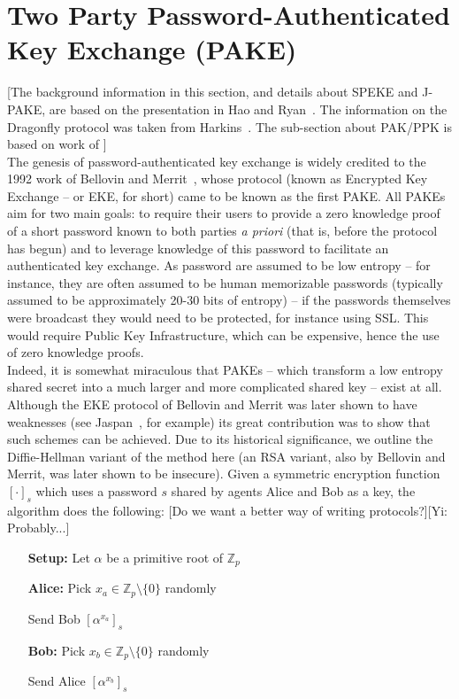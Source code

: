 \documentclass{amsart}
\newcommand{\comment}[1]{\marginpar{\color{red}{\Huge$*$}}\mbox{}{\sf\color{red}[#1]}}
\theoremstyle{remark}
\begin{document}

\section{Two Party Password-Authenticated Key Exchange (PAKE)} 
\label{sec:PAKE}
 [The background information in this section, and details about SPEKE and J-PAKE, are based on the presentation 
 in Hao and Ryan~\cite{HaRy2010}. The information on the Dragonfly protocol was taken from Harkins~\cite{Ha15}.  
 The sub-section about PAK/PPK is based on work of \cite{BoMaPa00}]
 \\
 
 The genesis of password-authenticated key exchange is widely credited to the 1992 work of Bellovin and 
 Merrit~\cite{BeMe92}, whose protocol (known as Encrypted Key Exchange -- or EKE, for short) came to 
 be known as the first PAKE.  All PAKEs aim for two main goals: to require their users to provide a zero 
 knowledge proof of a short password known to both parties \emph{a priori} (that is, before the protocol 
 has begun) and to leverage knowledge of this password to facilitate an authenticated key exchange.  As 
 password are assumed to be low entropy -- for instance, they are often assumed to be human memorizable 
 passwords (typically assumed to be approximately 20-30 bits of entropy) -- if the passwords 
 themselves were broadcast they would need to be protected, for instance using SSL.  This would require Public 
 Key Infrastructure, which can be expensive, hence the use of zero knowledge proofs.
 \\

 Indeed, it is somewhat miraculous that PAKEs -- which transform a low entropy shared secret into a 
 much larger and more complicated shared key -- exist at all.  Although the EKE protocol of Bellovin and 
 Merrit was later shown to have weaknesses (see Jaspan~\cite{Ja96}, for example) its great contribution was 
 to show that such schemes can be achieved.  Due to its historical significance, we outline the Diffie-Hellman
 variant of the method here (an RSA variant, also by Bellovin and Merrit, was later shown to be insecure).  
 Given a symmetric encryption function $[\cdot]_s$ which uses a password $s$ shared
 by agents Alice and Bob as a key, the algorithm does the following: \comment{Do we want a better way of writing protocols?}\comment{Yi: Probably...}
 \\

 \begin{itemize}
 \item[\textbf{Setup:}] Let $\alpha$ be a primitive root of $\mathbb{Z}_p$
 \item[\textbf{Alice:}] Pick $x_a \in \mathbb{Z}_p \setminus \{0\}$ randomly
 \item[] Send Bob $\left[\alpha^{x_a}\right]_s$
  \item[\textbf{Bob:}] Pick $x_b \in \mathbb{Z}_p \setminus \{0\}$ randomly
 \item[] Send Alice $\left[\alpha^{x_b}\right]_s$
 \item[]
 \end{itemize}
\end{document}
